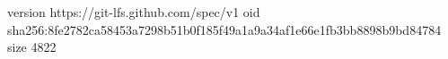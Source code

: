 version https://git-lfs.github.com/spec/v1
oid sha256:8fe2782ca58453a7298b51b0f185f49a1a9a34af1e66e1fb3bb8898b9bd84784
size 4822
